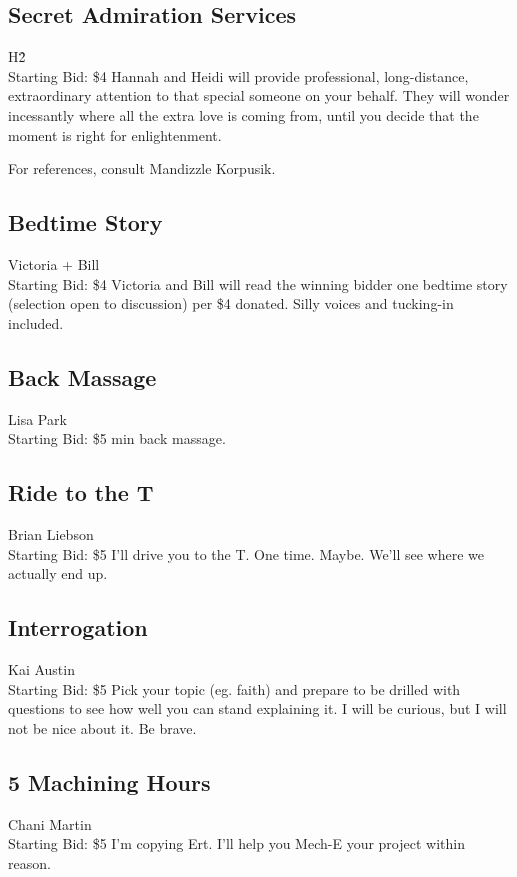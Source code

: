 \documentclass[11pt]{article}
\begin{document}
\subsection{Secret Admiration Services}
H\^2
\\
Starting Bid: \$4
\newline
Hannah and Heidi will provide professional, long-distance, extraordinary attention to that special someone on your behalf. They will wonder incessantly where all the extra love is coming from, until you decide that the moment is right for enlightenment. 

For references, consult Mandizzle Korpusik.
\subsection{Bedtime Story}
Victoria + Bill
\\
Starting Bid: \$4
\newline
Victoria and Bill will read the winning bidder one bedtime story (selection open to discussion) per \$4 donated. Silly voices and tucking-in included.
\subsection{Back Massage}
Lisa Park
\\
Starting Bid: \$5
 min back massage.
\subsection{Ride to the T}
Brian Liebson
\\
Starting Bid: \$5
\newline
I'll drive you to the T. One time. Maybe. We'll see where we actually end up.
\subsection{Interrogation}
Kai Austin
\\
Starting Bid: \$5
\newline
Pick your topic (eg. faith) and prepare to be drilled with questions to see how well you can stand explaining it. I will be curious, but I will not be nice about it. Be brave.
\subsection{5 Machining Hours}
Chani Martin
\\
Starting Bid: \$5
\newline
I'm copying Ert. 
I'll help you Mech-E your project within reason.
\end{document}
